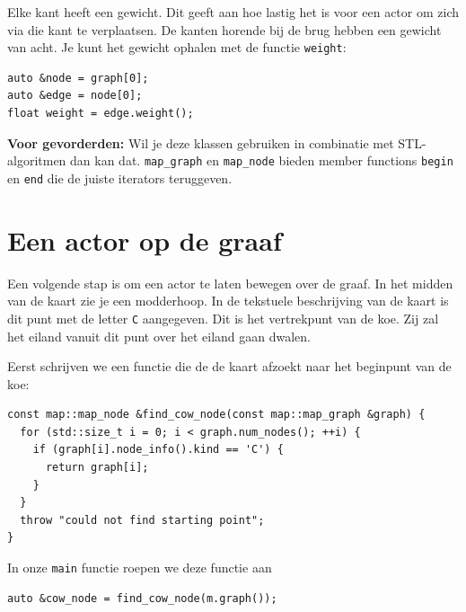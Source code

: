 \documentclass[11pt]{article}
\begin{document}
Elke kant heeft een gewicht. Dit geeft aan hoe lastig het is voor een actor
om zich via die kant te verplaatsen. De kanten horende bij de brug hebben
een gewicht van acht. Je kunt het gewicht ophalen met de functie \texttt{weight}:
\begin{verbatim}
auto &node = graph[0];
auto &edge = node[0];
float weight = edge.weight();
\end{verbatim}

\textbf{Voor gevorderden:} Wil je deze klassen gebruiken in combinatie met
STL-algoritmen dan kan dat. \texttt{map\_graph} en \texttt{map\_node} bieden member
functions \texttt{begin} en \texttt{end} die de juiste iterators teruggeven.


\section{Een actor op de graaf}
\label{sec:orgab4831a}
Een volgende stap is om een actor te laten bewegen over de graaf. In het
midden van de kaart zie je een modderhoop. In de tekstuele beschrijving van
de kaart is dit punt met de letter \texttt{C} aangegeven. Dit is het vertrekpunt van de
koe. Zij zal het eiland vanuit dit punt over het eiland gaan dwalen.

Eerst schrijven we een functie die de de kaart afzoekt naar het beginpunt
van de koe:
\begin{verbatim}
const map::map_node &find_cow_node(const map::map_graph &graph) {
  for (std::size_t i = 0; i < graph.num_nodes(); ++i) {
    if (graph[i].node_info().kind == 'C') {
      return graph[i];
    }
  }
  throw "could not find starting point";
}
\end{verbatim}

In onze \texttt{main} functie roepen we deze functie aan
\begin{verbatim}
auto &cow_node = find_cow_node(m.graph());
\end{verbatim}
\end{document}

